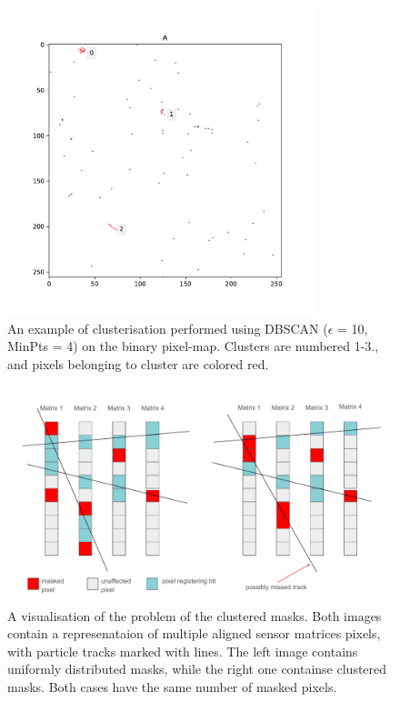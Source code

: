 \begin{figure}[h]
\centering
\includegraphics[width=0.8\textwidth]{figures/chapter4/velopix_clusters/example_clusters.pdf}
\caption{An example of clusterisation performed using DBSCAN ($\epsilon$ = 10, MinPts = 4) on the binary pixel-map. Clusters are numbered 1-3., and pixels belonging to cluster are colored red.}
\label{fig:dbscan_clusters}
\end{figure}


\begin{figure}[h]
\centering
\includegraphics[width=\textwidth]{figures/chapter4/velopix_clusters/pixel clusters.pdf}
\caption{A visualisation of the problem of the clustered masks. Both images contain a represenataion of multiple aligned sensor matrices pixels, with particle tracks marked with lines. The left image contains uniformly distributed masks, while the right one containse clustered masks. Both cases have the same number of masked pixels.}
\label{fig:cluster_masks}
\end{figure}

